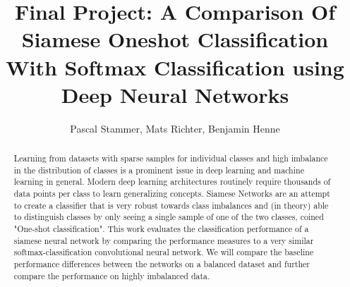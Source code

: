 ﻿\documentclass[a4paper,pt12]{article}
\begin{document}
\author{Pascal Stammer, Mats Richter, Benjamin Henne}
\title{Final Project: A Comparison Of Siamese Oneshot Classification With Softmax Classification using Deep Neural Networks}

\maketitle

\begin{abstract}
Learning from datasets with sparse samples for individual classes and high imbalance in the distribution of classes is a prominent issue in deep learning and machine learning in general. Modern deep learning architectures routinely require thousands of data points per class to learn generalizing concepts. Siamese Networks are an attempt to create a classifier that is very robust towards class imbalances and (in theory) able to distinguish classes by only seeing a single sample of one of the two classes, coined "One-shot classification". This work evaluates the classiﬁcation performance of a siamese neural network by comparing the performance measures to a very similar softmax-classiﬁcation convolutional neural network. We will compare the baseline performance diﬀerences between the networks on a balanced dataset and further compare the performance on highly imbalanced data.

\end{abstract}
\end{document}
